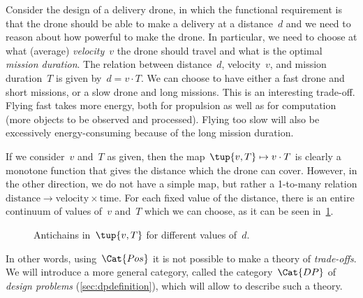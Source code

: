 \begin{example}
Consider the design of a delivery drone, in which the functional requirement is that the drone should be able to make a delivery at a distance~$d$ and we need to reason about how powerful to make the drone. In particular, we need to choose at what (average) \emph{velocity}~$v$ the drone  should travel and what is the optimal \emph{mission duration}. The relation between distance~$d$, velocity~$v$, and mission duration~$T$ is given by~$d=v\cdot T$. We can choose to have either a fast drone and short missions, or a slow drone and long missions. This is an interesting trade-off. Flying fast takes more energy, both for propulsion as well as for computation (more objects to be observed and processed). Flying too slow will also be excessively energy-consuming because of the long mission duration.

If we consider~$v$ and~$T$ as given, then the map~$\tup{v,T} \mapsto v\cdot T$ is clearly a monotone function that gives the distance which the drone can cover. However, in the other direction, we do not have a simple map, but rather a 1-to-many relation $\mathrm{distance}\to \mathrm{velocity}\times \mathrm{time}$. For each fixed value of the distance, there is an entire continuum of values of~$v$ and~$T$ which we can choose, as it can be seen in~\cref{fig:drone-example-antichain}.

\begin{figure}[h!]
    \centering
    \caption{Antichains in~$\tup{v,T}$ for different values of~$d$. \label{fig:drone-example}
    \label{fig:drone-example-antichain}}
\end{figure}

\end{example}

In other words, using~$\Cat{Pos}$ it is not possible to make a theory of \emph{trade-offs}. We will introduce a more general category, called  the category~$\Cat{DP}$ of \emph{design problems} (\cref{sec:dpdefinition}), which will allow to describe such a theory.

